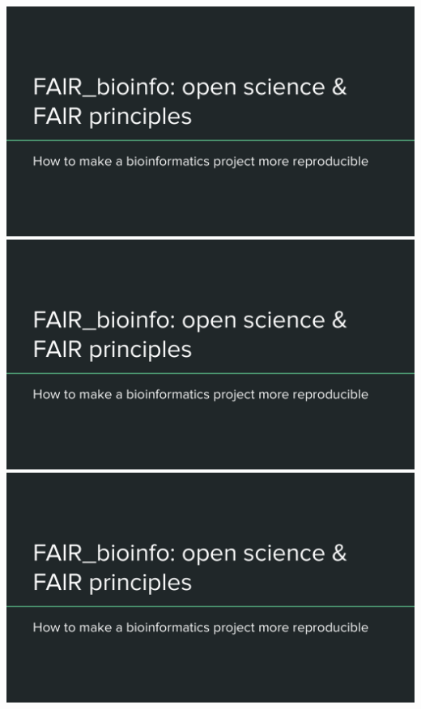 \includegraphics[page=11,scale=0.55]{01_OS_and_FAIR_intro.pdf}
\includegraphics[page=12,scale=0.6]{01_OS_and_FAIR_intro.pdf}
\includegraphics[page=13,scale=0.6]{01_OS_and_FAIR_intro.pdf}


